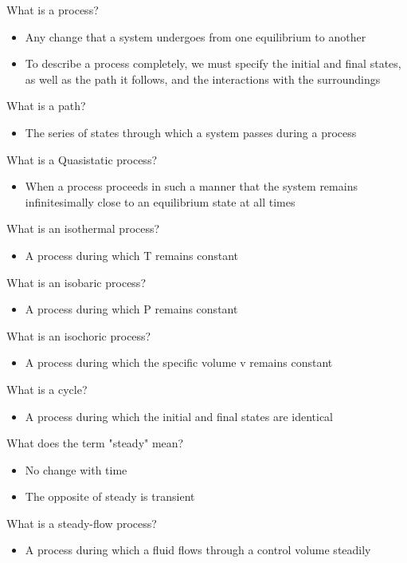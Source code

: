 \documentclass[class=report, crop=false, 12pt,a4paper]{standalone}
\begin{document}
What is a process?
\begin{itemize}
  \item Any change that a system undergoes from one equilibrium to another
  \item To describe a process completely, we must specify the initial and final states, as well as the path it follows, and the interactions with the surroundings
\end{itemize}

What is a path?
\begin{itemize}
  \item The series of states through which a system passes during a process
\end{itemize}

What is a Quasistatic process?
\begin{itemize}
  \item When a process proceeds in such a manner that the system remains infinitesimally close to an equilibrium state at all times
\end{itemize}

What is an isothermal process?
\begin{itemize}
  \item A process during which T remains constant
\end{itemize}

What is an isobaric process?
\begin{itemize}
  \item A process during which P remains constant
\end{itemize}

What is an isochoric process?
\begin{itemize}
  \item A process during which the specific volume v remains constant
\end{itemize}

What is a cycle?
\begin{itemize}
  \item A process during which the initial and final states are identical
\end{itemize}

What does the term "steady" mean?
\begin{itemize}
  \item No change with time
  \item The opposite of steady is transient
\end{itemize}

What is a steady-flow process?
\begin{itemize}
  \item A process during which a fluid flows through a control volume steadily
\end{itemize}
\end{document}
